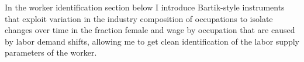 \documentclass[12pt]{article}
\begin{document}



In the worker identification section below I introduce Bartik-style instruments that exploit variation in the industry composition of occupations to isolate changes over time in the fraction female and wage by occupation that are caused by labor demand shifts, allowing me to get clean identification of the labor supply parameters of the worker.









\end{document}
